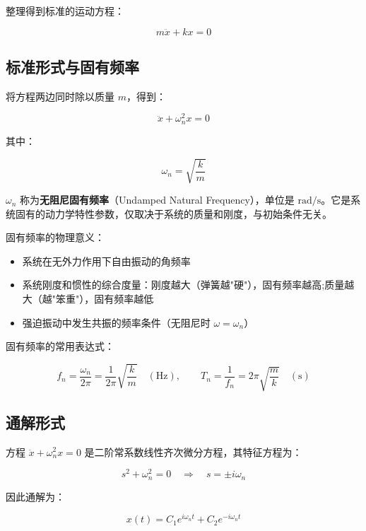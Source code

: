 整理得到标准的运动方程：
\begin{myformula}
    \[
    m\ddot{x} + kx = 0
    \]
\end{myformula}

\subsection{标准形式与固有频率}

将方程两边同时除以质量 $m$，得到：
\begin{myformula}
    \[
    \ddot{x} + \omega_n^2 x = 0
    \]
\end{myformula}

其中：
\begin{myformula}
    \[
    \omega_n = \sqrt{\frac{k}{m}}
    \]
\end{myformula}

$\omega_n$ 称为\textbf{无阻尼固有频率}（Undamped Natural Frequency），单位是 $\text{rad/s}$。它是系统固有的动力学特性参数，仅取决于系统的质量和刚度，与初始条件无关。

固有频率的物理意义：
\begin{itemize}
    \item 系统在无外力作用下自由振动的角频率
    \item 系统刚度和惯性的综合度量：刚度越大（弹簧越"硬"），固有频率越高;质量越大（越"笨重"），固有频率越低
    \item 强迫振动中发生共振的频率条件（无阻尼时 $\omega = \omega_n$）
\end{itemize}

固有频率的常用表达式：
\begin{myformula}
    \[
    f_n = \frac{\omega_n}{2\pi} = \frac{1}{2\pi}\sqrt{\frac{k}{m}}\quad (\text{Hz}),\qquad
    T_n = \frac{1}{f_n} = 2\pi\sqrt{\frac{m}{k}}\quad (\text{s})
    \]
\end{myformula}

\subsection{通解形式}

方程 $\ddot{x} + \omega_n^2 x = 0$ 是二阶常系数线性齐次微分方程，其特征方程为：
\begin{myformula}
    \[
    s^2 + \omega_n^2 = 0 \quad\Rightarrow\quad s = \pm i\omega_n
    \]
\end{myformula}

因此通解为：
\begin{myformula}
    \[
    x(t) = C_1 e^{i\omega_n t} + C_2 e^{-i\omega_n t}
    \]
\end{myformula}

